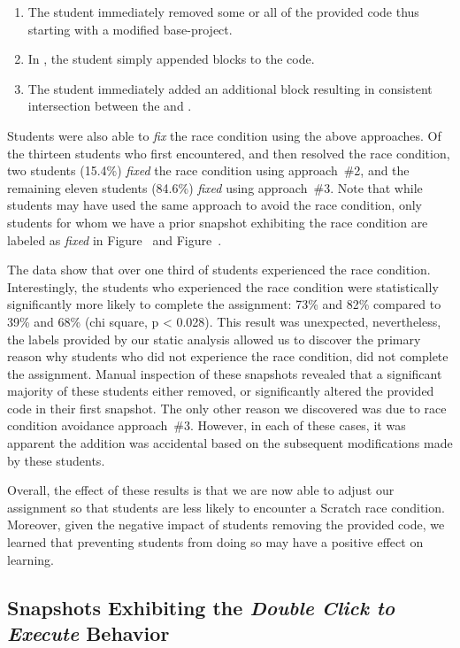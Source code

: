 \begin{enumerate}
\item The student immediately removed some or all of the provided code thus
  starting with a modified base-project.
\item In \stwo{}, the student simply appended \glideto{} blocks to the code.
\item The student immediately added an additional \glideDIST{} block resulting
  in consistent intersection between the \net{} and \zebra{}.
\end{enumerate}

Students were also able to \emph{fix} the race condition using the above
approaches. Of the thirteen students who first encountered, and then resolved
the race condition, two students (15.4\%) \emph{fixed} the race condition using
approach~\#2, and the remaining eleven students (84.6\%) \emph{fixed} using
approach~\#3. Note that while students may have used the same approach to avoid
the race condition, only students for whom we have a prior snapshot exhibiting
the race condition are labeled as \emph{fixed} in Figure~
and Figure~.

The data show that over one third of students experienced the race
condition. Interestingly, the students who experienced the race condition were
statistically significantly more likely to complete the assignment: 73\% and
82\% compared to 39\% and 68\% (chi square, p \textless{} 0.028). This result
was unexpected, nevertheless, the labels provided by our static analysis
allowed us to discover the primary reason why students who did not experience
the race condition, did not complete the assignment. Manual inspection of these
snapshots revealed that a significant majority of these students either
removed, or significantly altered the provided code in their first
snapshot. The only other reason we discovered was due to race condition
avoidance approach~\#3. However, in each of these cases, it was apparent the
addition was accidental based on the subsequent modifications made by these
students.

Overall, the effect of these results is that we are now able to adjust our
assignment so that students are less likely to encounter a Scratch race
condition. Moreover, given the negative impact of students removing the
provided code, we learned that preventing students from doing so may have a
positive effect on learning.

\subsection{Snapshots Exhibiting the \emph{Double Click to Execute} Behavior}

